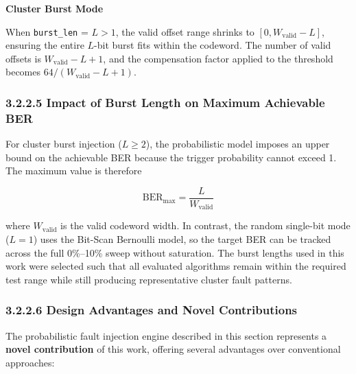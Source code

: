 \documentclass[
  english,
  12pt,
]{report}
\begin{document}
\textbf{Cluster Burst Mode}

When \texttt{burst\_len} = \(L > 1\), the valid offset range shrinks to
\([0, W_{\text{valid}} - L]\), ensuring the entire \(L\)-bit burst fits
within the codeword. The number of valid offsets is
\(W_{\text{valid}} - L + 1\), and the compensation factor applied to the
threshold becomes \(64 / (W_{\text{valid}} - L + 1)\).

\subsubsection{3.2.2.5 Impact of Burst Length on Maximum Achievable
BER}\label{impact-of-burst-length-on-maximum-achievable-ber}

For cluster burst injection (\(L \geq 2\)), the probabilistic model
imposes an upper bound on the achievable BER because the trigger
probability cannot exceed 1. The maximum value is therefore

\[\text{BER}_{\text{max}} = \frac{L}{W_{\text{valid}}}\]

where \(W_{\text{valid}}\) is the valid codeword width. In contrast, the
random single-bit mode (\(L=1\)) uses the Bit-Scan Bernoulli model, so
the target BER can be tracked across the full 0\%--10\% sweep without
saturation. The burst lengths used in this work were selected such that
all evaluated algorithms remain within the required test range while
still producing representative cluster fault patterns.

\subsubsection{3.2.2.6 Design Advantages and Novel
Contributions}\label{design-advantages-and-novel-contributions}

The probabilistic fault injection engine described in this section
represents a \textbf{novel contribution} of this work, offering several
advantages over conventional approaches:
\end{document}
